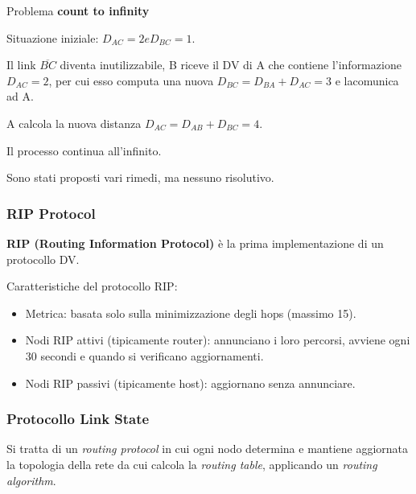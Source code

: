             Problema \textbf{count to infinity}
            
            

            Situazione iniziale: $D_{AC} = 2 e D_{BC} = 1$.

            Il link $\overline{BC}$ diventa inutilizzabile, B riceve il DV di A che contiene l'informazione $D_{AC} = 2$, per cui esso computa una nuova $D_{BC} = D_{BA} + D_{AC} = 3$ e lacomunica ad A.

            A calcola la nuova distanza $D_{AC} = D_{AB} + D_{BC} = 4$.

            Il processo continua all'infinito.

            Sono stati proposti vari rimedi, ma nessuno risolutivo.

        \subsubsection{RIP Protocol}
            \textbf{RIP (Routing Information Protocol)} è la prima implementazione di un protocollo DV.
        
            Caratteristiche del protocollo RIP:
            \begin{itemize}
                \item Metrica: basata solo sulla minimizzazione degli hops (massimo 15).
                \item Nodi RIP attivi (tipicamente router): annunciano i loro percorsi, avviene ogni 30 secondi e quando si verificano aggiornamenti.
                \item Nodi RIP passivi (tipicamente host): aggiornano senza annunciare.
            \end{itemize}
        
        \subsubsection{Protocollo Link State}
            Si tratta di un \textit{routing protocol} in cui ogni nodo determina e mantiene aggiornata la topologia della rete da cui calcola la \textit{routing table}, applicando un \textit{routing algorithm}.

